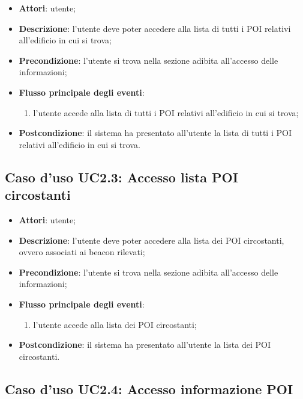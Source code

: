 \documentclass[../AnalisiDeiRequisiti.tex]{subfiles}
\begin{document}
\begin{itemize}
\item \textbf{Attori}: utente;
\item \textbf{Descrizione}: l'utente deve poter accedere alla lista di tutti i POI relativi all'edificio in cui si trova; 
      \item \textbf{Precondizione}: l'utente si trova nella sezione adibita all'accesso delle informazioni;

        \item \textbf{Flusso principale degli eventi}:
          \begin{enumerate}
          \item l'utente accede alla lista di tutti i POI relativi all'edificio in cui si trova;

      \end{enumerate}
    \item \textbf{Postcondizione}: il sistema ha presentato all'utente la lista di tutti i POI relativi all'edificio in cui si trova.
  \end{itemize}
\hypertarget{UC2.3}{}
\subsection{Caso d'uso UC2.3: Accesso lista POI circostanti}
\begin{itemize}
\item \textbf{Attori}: utente;
\item \textbf{Descrizione}: l'utente deve poter accedere alla lista dei POI circostanti, ovvero associati ai beacon rilevati; 
      \item \textbf{Precondizione}: l'utente si trova nella sezione adibita all'accesso delle informazioni;

        \item \textbf{Flusso principale degli eventi}:
          \begin{enumerate}
          \item l'utente accede alla lista dei POI circostanti;

      \end{enumerate}
    \item \textbf{Postcondizione}: il sistema ha presentato all'utente la lista dei POI circostanti.
  \end{itemize}
\hypertarget{UC2.4}{}
\subsection{Caso d'uso UC2.4: Accesso informazione POI}
\end{document}
